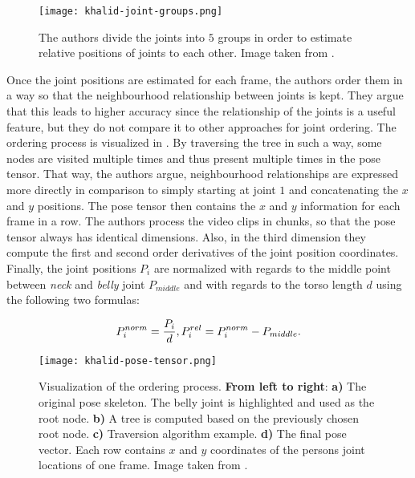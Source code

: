 \begin{figure}[htb!]
    \centering
    \texttt{[image: khalid-joint-groups.png]}
    \caption{The authors divide the joints into $5$ groups in order to estimate relative positions of joints to each other. Image taken from \cite{khalid_multi-modal_2018}. }
    \label{fig:khalid-joint-groups}
\end{figure}

Once the joint positions are estimated for each frame, the authors order them in a way so that the neighbourhood relationship between joints is kept.
They argue that this leads to higher accuracy since the relationship of the joints is a useful feature, but they do not compare it to other approaches for joint ordering.
The ordering process is visualized in .
By traversing the tree in such a way, some nodes are visited multiple times and thus present multiple times in the pose tensor.
That way, the authors argue, neighbourhood relationships are expressed more directly in comparison to simply starting at joint $1$ and concatenating the $x$ and $y$ positions.
The pose tensor then contains the $x$ and $y$ information for each frame in a row.
The authors process the video clips in chunks, so that the pose tensor always has identical dimensions.
Also, in the third dimension they compute the first and second order derivatives of the joint position coordinates.
Finally, the joint positions $P_i$ are normalized with regards to the middle point between \textit{neck} and \textit{belly} joint $P_{middle}$ and with regards to the torso length $d$ using the following two formulas:

\begin{equation}
    P^{norm}_i = \frac{P_i}{d}, \\
    P^{rel}_i = P^{norm}_i - P_{middle}.
\end{equation}

\begin{figure}[htb!]
    \centering
    \texttt{[image: khalid-pose-tensor.png]}
    \caption{Visualization of the ordering process. \textbf{From left to right}: \textbf{a)} The original pose skeleton. The belly joint is highlighted and used as the root node. \textbf{b)} A tree is computed based on the previously chosen root node. \textbf{c)} Traversion algorithm example. \textbf{d)} The final pose vector. Each row contains $x$ and $y$ coordinates of the persons joint locations of one frame. Image taken from \cite{khalid_multi-modal_2018}. }
    \label{fig:khalid-pose-tensor}
\end{figure}

